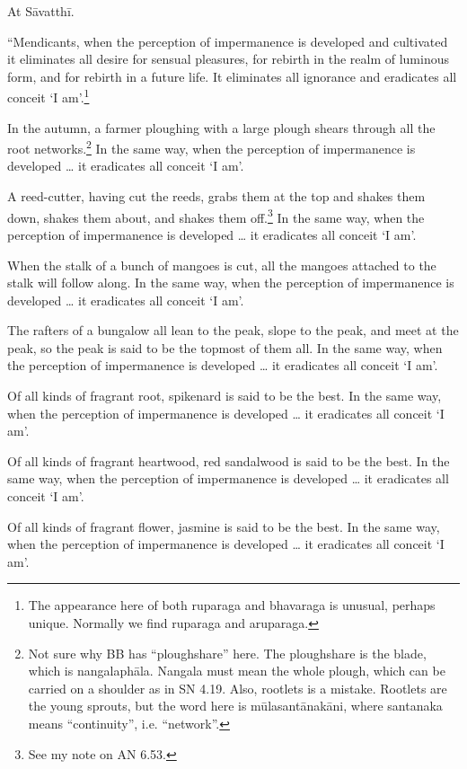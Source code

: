 \documentclass[12pt,openany]{book}%
\begin{document}
At \textsanskrit{Sāvatthī}. 

“Mendicants, when the perception of impermanence is developed and cultivated it eliminates all desire for sensual pleasures, for rebirth in the realm of luminous form, and for rebirth in a future life. It eliminates all ignorance and eradicates all conceit ‘I am’.\footnote{The appearance here of both ruparaga and bhavaraga is unusual, perhaps unique. Normally we find ruparaga and aruparaga. } 

In the autumn, a farmer ploughing with a large plough shears through all the root networks.\footnote{Not sure why BB has “ploughshare” here. The ploughshare is the blade, which is \textsanskrit{nangalaphāla}. Nangala must mean the whole plough, which can be carried on a shoulder as in SN 4.19. Also, rootlets is a mistake. Rootlets are the young sprouts, but the word here is \textsanskrit{mūlasantānakāni}, where santanaka means “continuity”, i.e. “network”. } In the same way, when the perception of impermanence is developed … it eradicates all conceit ‘I am’. 

A reed-cutter, having cut the reeds, grabs them at the top and shakes them down, shakes them about, and shakes them off.\footnote{See my note on AN 6.53. } In the same way, when the perception of impermanence is developed … it eradicates all conceit ‘I am’. 

When the stalk of a bunch of mangoes is cut, all the mangoes attached to the stalk will follow along. In the same way, when the perception of impermanence is developed … it eradicates all conceit ‘I am’. 

The rafters of a bungalow all lean to the peak, slope to the peak, and meet at the peak, so the peak is said to be the topmost of them all. In the same way, when the perception of impermanence is developed … it eradicates all conceit ‘I am’. 

Of all kinds of fragrant root, spikenard is said to be the best. In the same way, when the perception of impermanence is developed … it eradicates all conceit ‘I am’. 

Of all kinds of fragrant heartwood, red sandalwood is said to be the best. In the same way, when the perception of impermanence is developed … it eradicates all conceit ‘I am’. 

Of all kinds of fragrant flower, jasmine is said to be the best. In the same way, when the perception of impermanence is developed … it eradicates all conceit ‘I am’. 
\end{document}
